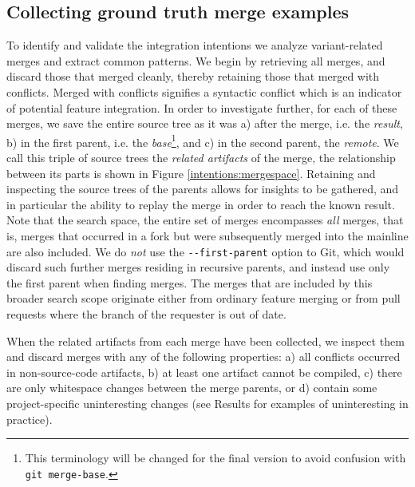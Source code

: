 \subsection{Collecting ground truth merge examples}
To identify and validate the integration intentions we analyze variant-related merges and extract common patterns. We begin by retrieving all merges, and discard those that merged cleanly, thereby retaining those that merged with conflicts. Merged with conflicts signifies a syntactic conflict which is an indicator of potential feature integration. In order to investigate further, for each of these merges, we save the entire source tree as it was 
a) after the merge, i.e. the \textit{result},
b) in the first parent, i.e. the \textit{base}\footnote{This terminology will be changed for the final version to avoid confusion with \texttt{git merge-base}.}, and
c) in the second parent, the \textit{remote}. We call this triple of source trees the \textit{related artifacts} of the merge, the relationship between its parts is shown in Figure \ref{intentions:mergespace}. Retaining and inspecting the source trees of the parents allows for insights to be gathered, and in particular the ability to replay the merge in order to reach the known result. Note that the search space, the entire set of merges encompasses \textit{all} merges, that is, merges that occurred in a fork but were subsequently merged into the mainline are also included. We do \textit{not} use the \texttt{-{}-first-parent} option to Git, which would discard such further merges residing in recursive parents, and instead use only the first parent when finding merges. The merges that are included by this broader search scope originate either from ordinary feature merging or from pull requests where the branch of the requester is out of date.%

When the related artifacts from each merge have been collected, we inspect them and discard merges with any of the following properties: 
a) all conflicts occurred in non-source-code artifacts, b) at least one artifact cannot be compiled, c) there are only whitespace changes between the merge parents, or d) contain some project-specific uninteresting changes (see Results for examples of uninteresting in practice).

